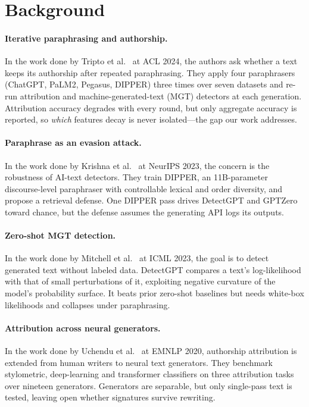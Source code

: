 \section{Background}

\paragraph{Iterative paraphrasing and authorship.}
In the work done by Tripto et al.~\cite{tripto2024ship} at ACL 2024, the authors ask whether a
text keeps its authorship after repeated paraphrasing. They apply four paraphrasers (ChatGPT,
PaLM2, Pegasus, DIPPER) three times over seven datasets and re-run attribution and
machine-generated-text (MGT) detectors at each generation. Attribution accuracy degrades with
every round, but only aggregate accuracy is reported, so \emph{which} features decay is never
isolated---the gap our work addresses.

\paragraph{Paraphrase as an evasion attack.}
In the work done by Krishna et al.~\cite{krishna2023paraphrasing} at NeurIPS 2023, the concern is
the robustness of AI-text detectors. They train DIPPER, an 11B-parameter discourse-level
paraphraser with controllable lexical and order diversity, and propose a retrieval defense. One
DIPPER pass drives DetectGPT and GPTZero toward chance, but the defense assumes the generating API
logs its outputs.

\paragraph{Zero-shot MGT detection.}
In the work done by Mitchell et al.~\cite{mitchell2023detectgpt} at ICML 2023, the goal is to
detect generated text without labeled data. DetectGPT compares a text's log-likelihood with that of
small perturbations of it, exploiting negative curvature of the model's probability surface. It
beats prior zero-shot baselines but needs white-box likelihoods and collapses under paraphrasing.

\paragraph{Attribution across neural generators.}
In the work done by Uchendu et al.~\cite{uchendu2020authorship} at EMNLP 2020, authorship
attribution is extended from human writers to neural text generators. They benchmark stylometric,
deep-learning and transformer classifiers on three attribution tasks over nineteen generators.
Generators are separable, but only single-pass text is tested, leaving open whether signatures
survive rewriting.

